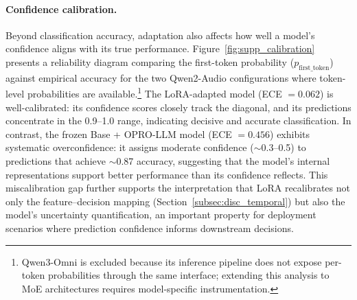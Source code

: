 \documentclass[11pt,a4paper]{article}
\begin{document}
\paragraph{Confidence calibration.}
Beyond classification accuracy, adaptation also affects how well a model's confidence aligns with its true performance. Figure~\ref{fig:supp_calibration} presents a reliability diagram comparing the first-token probability ($p_{\text{first\_token}}$) against empirical accuracy for the two Qwen2-Audio configurations where token-level probabilities are available.\footnote{Qwen3-Omni is excluded because its inference pipeline does not expose per-token probabilities through the same interface; extending this analysis to MoE architectures requires model-specific instrumentation.} The LoRA-adapted model (ECE $= 0.062$) is well-calibrated: its confidence scores closely track the diagonal, and its predictions concentrate in the 0.9--1.0 range, indicating decisive and accurate classification. In contrast, the frozen Base + OPRO-LLM model (ECE $= 0.456$) exhibits systematic overconfidence: it assigns moderate confidence ($\sim$0.3--0.5) to predictions that achieve $\sim$0.87 accuracy, suggesting that the model's internal representations support better performance than its confidence reflects. This miscalibration gap further supports the interpretation that LoRA recalibrates not only the feature--decision mapping (Section~\ref{subsec:disc_temporal}) but also the model's uncertainty quantification, an important property for deployment scenarios where prediction confidence informs downstream decisions.
\end{document}

